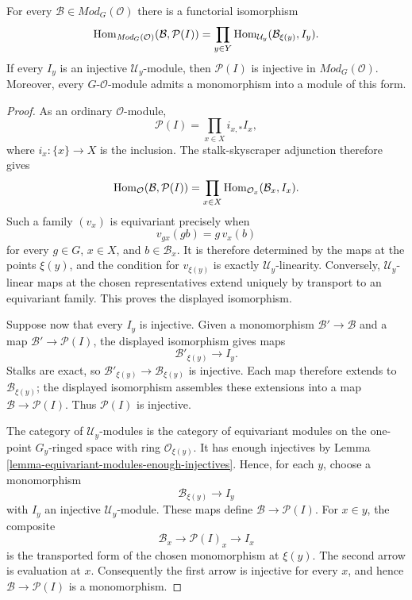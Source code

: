 \begin{lemma}
\label{lemma-equivariant-product-injectives}
\begin{reference}
\cite[Chapter V, \S 5.1, Proposition 5.1.2, p. 197]{Tohoku}
\end{reference}
For every $\mathcal{B}\in\textit{Mod}_G(\mathcal{O})$ there is a
functorial isomorphism
$$
\mathop{\mathrm{Hom}}\nolimits_{\textit{Mod}_G(\mathcal{O})}
(\mathcal{B},\mathcal{P}(I))
=
\prod_{y\in Y}
\mathop{\mathrm{Hom}}\nolimits_{\mathcal{U}_y}
(\mathcal{B}_{\xi(y)},I_y).
$$
If every $I_y$ is an injective $\mathcal{U}_y$-module, then
$\mathcal{P}(I)$ is injective in
$\textit{Mod}_G(\mathcal{O})$. Moreover, every
$G$-$\mathcal{O}$-module admits a monomorphism into a module of this form.
\end{lemma}

\begin{proof}
As an ordinary $\mathcal{O}$-module,
$$
\mathcal{P}(I)=\prod_{x\in X}i_{x,*}I_x,
$$
where $i_x:\{x\}\to X$ is the inclusion. The stalk-skyscraper adjunction
therefore gives
$$
\mathop{\mathrm{Hom}}\nolimits_{\mathcal{O}}(\mathcal{B},\mathcal{P}(I))
=
\prod_{x\in X}
\mathop{\mathrm{Hom}}\nolimits_{\mathcal{O}_x}(\mathcal{B}_x,I_x).
$$
Such a family $(v_x)$ is equivariant precisely when
$$
v_{gx}(g b)=g\,v_x(b)
$$
for every $g\in G$, $x\in X$, and $b\in\mathcal{B}_x$. It is therefore
determined by the maps at the points $\xi(y)$, and the condition for
$v_{\xi(y)}$ is exactly $\mathcal{U}_y$-linearity. Conversely,
$\mathcal{U}_y$-linear maps at the chosen representatives extend uniquely
by transport to an equivariant family. This proves the displayed
isomorphism.

Suppose now that every $I_y$ is injective. Given a monomorphism
$\mathcal{B}'\to\mathcal{B}$ and a map
$\mathcal{B}'\to\mathcal{P}(I)$, the displayed isomorphism gives maps
$$
\mathcal{B}'_{\xi(y)}\longrightarrow I_y.
$$
Stalks are exact, so
$\mathcal{B}'_{\xi(y)}\to\mathcal{B}_{\xi(y)}$ is injective. Each map
therefore extends to $\mathcal{B}_{\xi(y)}$; the displayed isomorphism
assembles these extensions into a map
$\mathcal{B}\to\mathcal{P}(I)$. Thus $\mathcal{P}(I)$ is injective.

The category of $\mathcal{U}_y$-modules is the category of equivariant
modules on the one-point $G_y$-ringed space with ring
$\mathcal O_{\xi(y)}$. It has enough injectives by
Lemma \ref{lemma-equivariant-modules-enough-injectives}. Hence, for each
$y$, choose a monomorphism
$$
\mathcal{B}_{\xi(y)}\longrightarrow I_y
$$
with $I_y$ an injective $\mathcal{U}_y$-module. These maps define
$\mathcal{B}\to\mathcal{P}(I)$. For $x\in y$, the composite
$$
\mathcal{B}_x\longrightarrow\mathcal{P}(I)_x\longrightarrow I_x
$$
is the transported form of the chosen monomorphism at $\xi(y)$. The
second arrow is evaluation at $x$. Consequently the first arrow is
injective for every $x$, and hence
$\mathcal{B}\to\mathcal{P}(I)$ is a monomorphism.
\end{proof}


